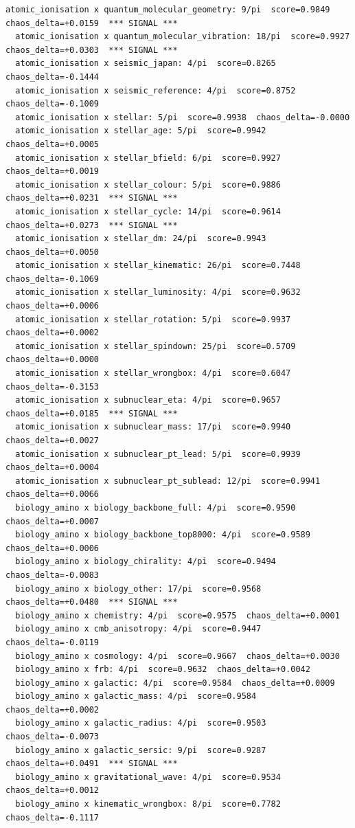 \documentclass[11pt, letterpaper, openany]{book}
\begin{document}
\begin{empiricalbox}
\begin{lstlisting}[style=terminal]
  atomic_ionisation x quantum_molecular_geometry: 9/pi  score=0.9849  chaos_delta=+0.0159  *** SIGNAL ***
  atomic_ionisation x quantum_molecular_vibration: 18/pi  score=0.9927  chaos_delta=+0.0303  *** SIGNAL ***
  atomic_ionisation x seismic_japan: 4/pi  score=0.8265  chaos_delta=-0.1444
  atomic_ionisation x seismic_reference: 4/pi  score=0.8752  chaos_delta=-0.1009
  atomic_ionisation x stellar: 5/pi  score=0.9938  chaos_delta=-0.0000
  atomic_ionisation x stellar_age: 5/pi  score=0.9942  chaos_delta=+0.0005
  atomic_ionisation x stellar_bfield: 6/pi  score=0.9927  chaos_delta=+0.0019
  atomic_ionisation x stellar_colour: 5/pi  score=0.9886  chaos_delta=+0.0231  *** SIGNAL ***
  atomic_ionisation x stellar_cycle: 14/pi  score=0.9614  chaos_delta=+0.0273  *** SIGNAL ***
  atomic_ionisation x stellar_dm: 24/pi  score=0.9943  chaos_delta=+0.0050
  atomic_ionisation x stellar_kinematic: 26/pi  score=0.7448  chaos_delta=-0.1069
  atomic_ionisation x stellar_luminosity: 4/pi  score=0.9632  chaos_delta=+0.0006
  atomic_ionisation x stellar_rotation: 5/pi  score=0.9937  chaos_delta=+0.0002
  atomic_ionisation x stellar_spindown: 25/pi  score=0.5709  chaos_delta=+0.0000
  atomic_ionisation x stellar_wrongbox: 4/pi  score=0.6047  chaos_delta=-0.3153
  atomic_ionisation x subnuclear_eta: 4/pi  score=0.9657  chaos_delta=+0.0185  *** SIGNAL ***
  atomic_ionisation x subnuclear_mass: 17/pi  score=0.9940  chaos_delta=+0.0027
  atomic_ionisation x subnuclear_pt_lead: 5/pi  score=0.9939  chaos_delta=+0.0004
  atomic_ionisation x subnuclear_pt_sublead: 12/pi  score=0.9941  chaos_delta=+0.0066
  biology_amino x biology_backbone_full: 4/pi  score=0.9590  chaos_delta=+0.0007
  biology_amino x biology_backbone_top8000: 4/pi  score=0.9589  chaos_delta=+0.0006
  biology_amino x biology_chirality: 4/pi  score=0.9494  chaos_delta=-0.0083
  biology_amino x biology_other: 17/pi  score=0.9568  chaos_delta=+0.0480  *** SIGNAL ***
  biology_amino x chemistry: 4/pi  score=0.9575  chaos_delta=+0.0001
  biology_amino x cmb_anisotropy: 4/pi  score=0.9447  chaos_delta=-0.0119
  biology_amino x cosmology: 4/pi  score=0.9667  chaos_delta=+0.0030
  biology_amino x frb: 4/pi  score=0.9632  chaos_delta=+0.0042
  biology_amino x galactic: 4/pi  score=0.9584  chaos_delta=+0.0009
  biology_amino x galactic_mass: 4/pi  score=0.9584  chaos_delta=+0.0002
  biology_amino x galactic_radius: 4/pi  score=0.9503  chaos_delta=-0.0073
  biology_amino x galactic_sersic: 9/pi  score=0.9287  chaos_delta=+0.0491  *** SIGNAL ***
  biology_amino x gravitational_wave: 4/pi  score=0.9534  chaos_delta=+0.0012
  biology_amino x kinematic_wrongbox: 8/pi  score=0.7782  chaos_delta=-0.1117

\end{lstlisting}
\end{empiricalbox}
\end{document}
